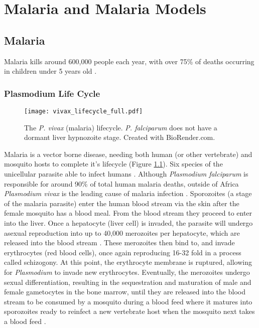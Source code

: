 \chapter{Malaria and Malaria Models}

\section{Malaria}

Malaria kills around 600,000 people each year, with over 75\% of deaths
occurring in children under 5 years old
\parencite{world_health_organization_world_2022}.

\subsection*{Plasmodium Life Cycle}

\begin{figure}[htbp]
    \centering
    \texttt{[image: vivax\_lifecycle\_full.pdf]}
    \caption{
        The \emph{P. vivax} (malaria) lifecycle. \emph{P. falciparum}
        does not have a dormant liver hypnozoite stage. Created with
        BioRender.com.
    }
    \label{fig:mal_lc}
\end{figure}

Malaria is a vector borne disease, needing both human (or other vertebrate) and
mosquito hosts to complete it's lifecycle (Figure \ref{fig:mal_lc}). Six
species of the unicellular parasite able to infect humans
\parencite{milner_malaria_2018}. Although \textit{Plasmodium falciparum} is
responsible for around 90\% of total human malaria deaths, outside of Africa
\textit{Plasmodium vivax} is the leading cause of malaria infection
\parencite{zekar_plasmodium_2023, adams_biology_2017}. Sporozoites (a stage of
the malaria parasite) enter the human blood stream via the skin after the
female mosquito has a blood meal. From the blood stream they proceed to enter
into the liver. Once a hepatocyte (liver cell) is invaded, the parasite will
undergo asexual reproduction into up to 40,000 merozoites per hepatocyte, which
are released into the blood stream . These merozoites then bind to, and invade
erythrocytes (red blood cells), once again reproducing 16-32 fold in a process
called schizogony. At this point, the erythrocyte membrane is ruptured,
allowing for \textit{Plasmodium} to invade new erythrocytes. Eventually, the
merozoites undergo sexual differentiation, resulting in the sequestration and
maturation of male and female gametocytes in the bone marrow, until they are
released into the blood stream to be consumed by a mosquito during a blood feed
where it matures into sporozoites ready to reinfect a new vertebrate host when
the mosquito next takes a blood feed \parencite{cowman_malaria_2016}.

